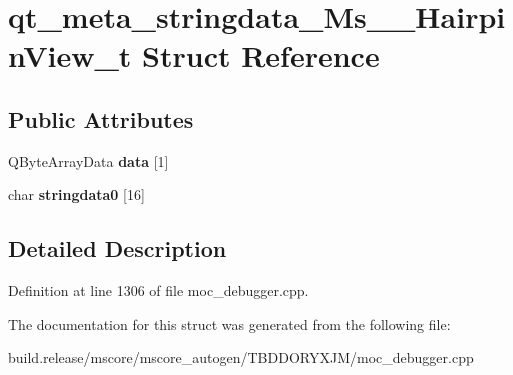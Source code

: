 \hypertarget{structqt__meta__stringdata___ms_____hairpin_view__t}{}\section{qt\+\_\+meta\+\_\+stringdata\+\_\+\+Ms\+\_\+\+\_\+\+Hairpin\+View\+\_\+t Struct Reference}
\label{structqt__meta__stringdata___ms_____hairpin_view__t}
\subsection*{Public Attributes}
\begin{DoxyCompactItemize}
\item 
\mbox{\label{structqt__meta__stringdata___ms_____hairpin_view__t_a0558a5a0d86fbaef932de645aa938dd5}} 
Q\+Byte\+Array\+Data {\bfseries data} \mbox{[}1\mbox{]}
\item 
\mbox{\label{structqt__meta__stringdata___ms_____hairpin_view__t_a85a28416261cfbe308267b19732ff7b3}} 
char {\bfseries stringdata0} \mbox{[}16\mbox{]}
\end{DoxyCompactItemize}


\subsection{Detailed Description}


Definition at line 1306 of file moc\+\_\+debugger.\+cpp.



The documentation for this struct was generated from the following file\+:\begin{DoxyCompactItemize}
\item 
build.\+release/mscore/mscore\+\_\+autogen/\+T\+B\+D\+D\+O\+R\+Y\+X\+J\+M/moc\+\_\+debugger.\+cpp\end{DoxyCompactItemize}
